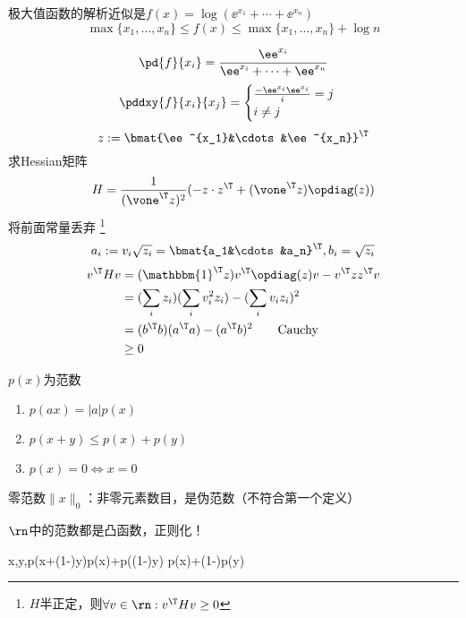 \documentclass{note}
\begin{document}
极大值函数的解析近似是$f(x)=\log(\ee^{x_1}+\cdots+\ee^{x_n})$
\[\max\{x_1,\ldots,x_n\}\leq f(x)\leq\max\{x_1,\ldots,x_n\}+\log n\]
\begin{analysis}
\[\pd{f}{x_i}=\frac{\ee^{x_i}}{\ee^{x_i}+\cdots+\ee^{x_n}}\]
\[\pddxy{f}{x_i}{x_j}=\begin{cases}\frac{-\ee^{x_i}\ee^{x_i}}i=j\\i\ne j\end{cases}\]
\[z:=\bmat{\ee^{x_1}&\cdots&\ee^{x_n}}^\T\]
求Hessian矩阵
\[H=\frac{1}{(\vone^\T z)^2}(-z\cdot z^\T+(\vone^\T z)\opdiag(z))\]
将前面常量丢弃
\footnote{$H$半正定，则$\forall v\in\rn:v^\T Hv\geq 0$}
\[a_i:=v_i\sqrt{z_i}=\bmat{a_1&\cdots&a_n}^\T,b_i=\sqrt{z_i}\]
\[\begin{aligned}
v^\T Hv&=(\mathbbm{1}^\T z)v^\T \opdiag(z)v-v^\T zz^\T v\\
&=(\sum_i z_i)(\sum_i v_i^2 z_i)-(\sum_i v_i z_i)^2\\
&=(b^\T b)(a^\T a)-(a^\T b)^2\qquad\text{Cauchy}\\
&\geq 0
\end{aligned}\]
\end{analysis}

\begin{definition}[范数]
$p(x)$为范数
\begin{enumerate}
	\item $p(ax)=|a|p(x)$
	\item $p(x+y)\leq p(x)+p(y)$
	\item $p(x)=0\iff x=0$
\end{enumerate}
零范数$\|x\|_0$：非零元素数目，是伪范数（不符合第一个定义）
\end{definition}
$\rn$中的范数都是凸函数，正则化！
\begin{analysis}
\forall x,y,\theta\in[0,1]
p(\theta x+(1-\theta)y)\leq p(\theta x)+p((1-\theta)y)
\leq \theta p(x)+(1-\theta)p(y)
\end{analysis}
\end{document}
